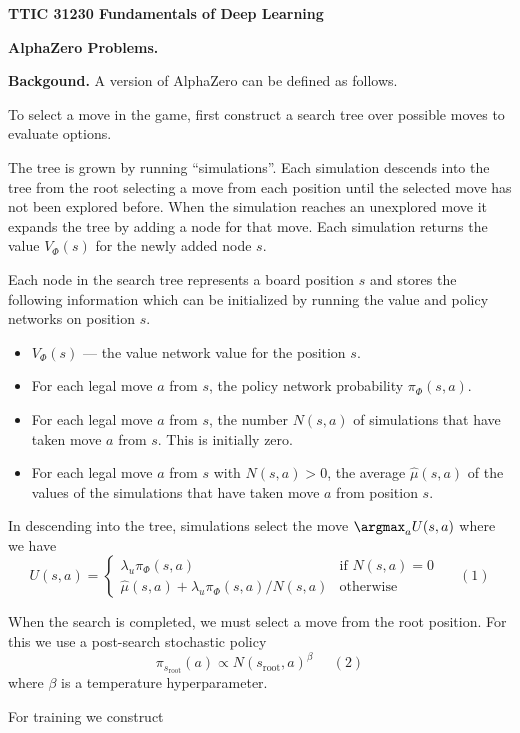 \documentclass{article}
\begin{document}
\centerline{\bf TTIC 31230 Fundamentals of Deep Learning}
\bigskip
\centerline{\bf AlphaZero Problems.}

\bigskip
\bigskip
{\bf Backgound.}
A version of AlphaZero can be defined as follows.

\medskip
To select a move in the game, first construct a search tree over possible moves to evaluate options.

\medskip
The tree is grown by running ``simulations''.  Each simulation descends into the tree from the root selecting a move from each position
until the selected move has not been explored before.  When the simulation reaches an unexplored move it expands the tree by adding a node for that move.
Each simulation returns the value $V_\Phi(s)$ for the newly added node $s$.

\medskip
Each node in the search tree represents a board position $s$ and stores the following information which can be initialized
by running the value and policy networks on position $s$.

\begin{itemize}
\item $V_\Phi(s)$ --- the value network value for the position $s$.
\item For each legal move $a$ from $s$, the policy network probability $\pi_\Phi(s,a)$.
\item For each legal move $a$ from $s$, the number $N(s,a)$ of simulations that have taken move $a$ from $s$. This is initially zero.
\item For each legal move $a$ from $s$ with $N(s,a) > 0$, the average $\hat{\mu}(s,a)$ of the values of the simulations that have
  taken move $a$ from position $s$.
\end{itemize}

\medskip
In descending into the tree, simulations select the move $\argmax_a U(s,a)$ where we have
$$U(s,a) =  \left\{\begin{array}{ll}\lambda_u \pi_\Phi(s,a) &\mbox{if $N(s,a) = 0$} \\ \hat{\mu}(s,a) + \lambda_u \pi_\Phi(s,a)/N(s,a) & \mbox{otherwise} \end{array}\right.\;\;\;\;\;(1)$$

\medskip
When the search is completed, we must select a move from the root position.  For this we use a post-search stochastic policy
$$\pi_{s_{\mathrm{root}}}(a) \propto N(s_{\mathrm{root}},a)^\beta\;\;\;\;\;(2)$$
where $\beta$ is a temperature hyperparameter.

\medskip
For training we construct
\end{document}
